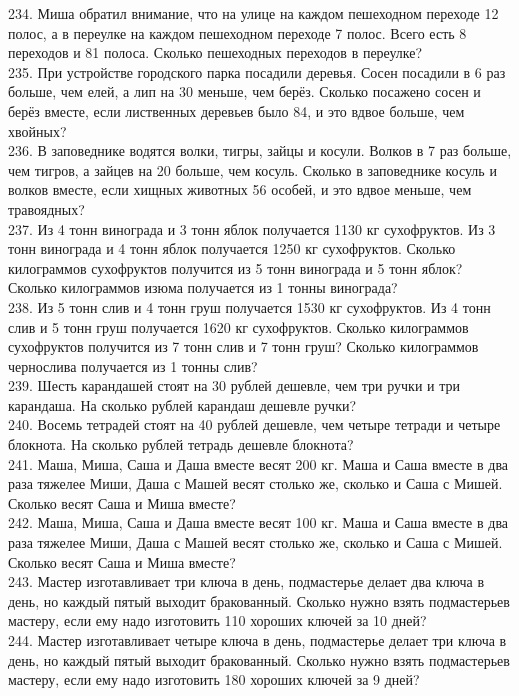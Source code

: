 \documentclass[12pt]{article}
\begin{document}
234. Миша обратил внимание, что на улице на каждом пешеходном переходе 12 полос, а в переулке на каждом пешеходном переходе 7 полос. Всего есть 8 переходов и 81 полоса. Сколько пешеходных переходов в переулке?\\
235. При устройстве городского парка посадили деревья. Сосен посадили в 6 раз больше, чем елей, а лип на 30 меньше, чем берёз. Сколько посажено сосен и берёз вместе, если лиственных деревьев было 84, и это вдвое больше, чем хвойных?\\
236. В заповеднике водятся волки, тигры, зайцы и косули. Волков в 7 раз больше, чем тигров, а зайцев на 20 больше, чем косуль. Сколько в заповеднике косуль и волков вместе, если хищных животных 56 особей, и это вдвое меньше, чем травоядных?\\
237. Из 4 тонн винограда и 3 тонн яблок получается 1130 кг сухофруктов. Из 3 тонн винограда и 4 тонн яблок получается 1250 кг сухофруктов. Сколько килограммов сухофруктов получится из 5 тонн винограда и 5 тонн яблок? Сколько килограммов изюма получается из 1 тонны винограда?\\
238. Из 5 тонн слив и 4 тонн груш получается 1530 кг сухофруктов. Из 4 тонн слив и 5 тонн груш получается 1620 кг сухофруктов. Сколько килограммов сухофруктов получится из 7 тонн слив и 7 тонн груш? Сколько килограммов чернослива получается из 1 тонны слив?\\
239. Шесть карандашей стоят на 30 рублей дешевле, чем три ручки и три карандаша. На сколько рублей карандаш дешевле ручки?\\
240. Восемь тетрадей стоят на 40 рублей дешевле, чем четыре тетради и четыре блокнота. На сколько рублей тетрадь дешевле блокнота?\\
241. Маша, Миша, Саша и Даша вместе  весят 200 кг. Маша и Саша вместе в два раза тяжелее Миши, Даша с Машей весят столько же, сколько и Саша с  Мишей. Сколько весят Саша и Миша вместе?\\
242. Маша, Миша, Саша и Даша вместе  весят 100 кг. Маша и Саша вместе в два раза тяжелее Миши, Даша с Машей весят столько же, сколько и Саша с  Мишей. Сколько весят Саша и Миша вместе?\\
243. Мастер изготавливает три ключа в день, подмастерье делает два ключа в день, но каждый пятый выходит бракованный. Сколько нужно взять подмастерьев мастеру, если ему надо изготовить 110 хороших ключей за 10 дней?\\
244. Мастер изготавливает четыре ключа в день, подмастерье делает три ключа в день, но каждый пятый выходит бракованный. Сколько нужно взять подмастерьев мастеру, если ему надо изготовить 180 хороших ключей за 9 дней?\\
\end{document}
